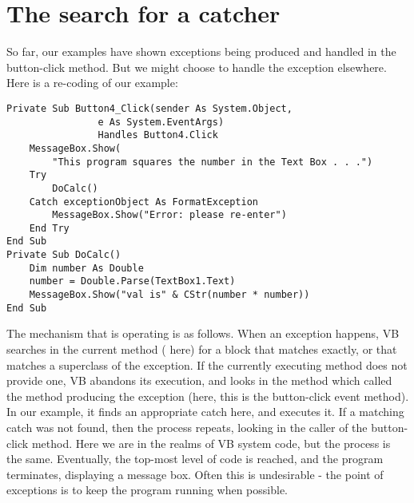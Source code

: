 	\section{The search for a catcher}
		So far, our examples have shown exceptions being produced and handled in the button-click method. But we might choose to handle the exception elsewhere. Here is a re-coding of our example:
		\begin{lstlisting}
Private Sub Button4_Click(sender As System.Object,
				e As System.EventArgs)
				Handles Button4.Click
	MessageBox.Show(
		"This program squares the number in the Text Box . . .")
	Try
		DoCalc()
	Catch exceptionObject As FormatException
		MessageBox.Show("Error: please re-enter")
	End Try
End Sub
Private Sub DoCalc()
	Dim number As Double
	number = Double.Parse(TextBox1.Text)
	MessageBox.Show("val is" & CStr(number * number))
End Sub
		\end{lstlisting}
		The mechanism that is operating is as follows. When an exception happens, VB searches in the current method ( here) for a  block that matches exactly, or that matches a superclass of the exception. If the currently executing method does not provide one, VB abandons its execution, and looks in the method which called the method producing the exception (here, this is the button-click event method). In our example, it finds an appropriate catch here, and executes it. If a matching catch was not found, then the process repeats, looking in the caller of the button-click method. Here we are in the realms of VB system code, but the process is the same. Eventually, the top-most level of code is reached, and the program terminates, displaying a message box. Often this is undesirable - the point of exceptions is to keep the program running when possible.
		
